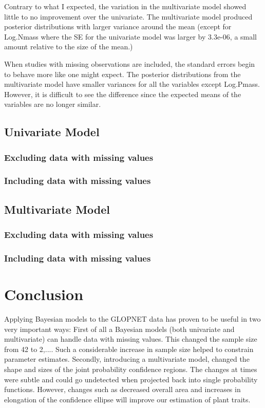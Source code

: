 \documentclass[12pt,fleqn]{article}
\theoremstyle{definition}
\theoremstyle{remark}
\theoremstyle{definition}
\begin{document}
Contrary to what I expected, the variation in the multivariate model showed little to no improvement over the univariate.  The multivariate model produced posterior distributions with larger variance around the mean (except for Log.Nmass where the SE for the univariate model was larger by 3.3e-06, a small amount relative to the size of the mean.)

When studies with missing observations are included, the standard errors begin to behave more like one might expect. The posterior distributions from the multivariate model have smaller variances for all the variables except Log.Pmass. However, it is difficult to see the difference since the expected means of the variables are no longer similar. 


\subsection{Univariate Model}
\subsubsection{Excluding data with missing values}
\subsubsection{Including data with missing values}


\subsection{Multivariate Model}


\subsubsection{Excluding data with missing values}
\subsubsection{Including data with missing values}


\section{Conclusion}

Applying Bayesian models to the GLOPNET data has proven to be useful in two very important ways: First of all a Bayesian models (both univariate and multivariate) can handle data with missing values. This changed the sample size from 42 to 2,.... Such a considerable increase in sample size helped to constrain parameter estimates. Secondly, introducing a multivariate model, changed the shape and sizes of the joint probability confidence regions. The changes at times were subtle and could go undetected when projected back into single probability functions. However, changes such as decreased overall area and increases in elongation of the confidence ellipse will improve our estimation of plant traits. 
\end{document}
